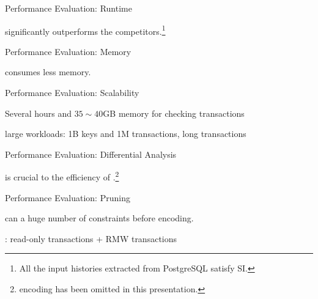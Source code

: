 \begin{frame}{Performance Evaluation: Runtime}
	\centerline{\polysi{} significantly outperforms the competitors.\footnote{
		All the input histories extracted from PostgreSQL satisfy SI.
	}}

\end{frame}

\begin{frame}{Performance Evaluation: Memory}
	\centerline{\polysi{} consumes less memory.}
\end{frame}

\begin{frame}{Performance Evaluation: Scalability}
	\begin{center}
		Several hours and $35 \sim 40$GB memory for checking  transactions

		\vspace{0.30cm}
		\vspace{0.30cm}

		large workloads: 1B keys and 1M transactions, long transactions
	\end{center}
\end{frame}

\begin{frame}{Performance Evaluation: Differential Analysis}
	\begin{center}
		 is crucial to the efficiency of \polysi.\footnote{
			 encoding has been omitted in this presentation.
		}

		\vspace{0.30cm}
	\end{center}
\end{frame}

\begin{frame}{Performance Evaluation: Pruning}
	\begin{center}
		\polysi{} can  a huge number of constraints before encoding.

		\vspace{0.30cm}
		
		\vspace{0.30cm}

		: read-only transactions + RMW transactions
	\end{center}
\end{frame}
